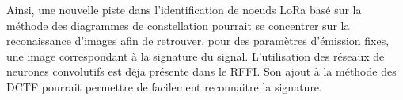\vspace{0.1cm}

Ainsi, une nouvelle piste dans l'identification de noeuds LoRa basé sur la méthode des diagrammes de constellation pourrait se concentrer sur la reconaissance d'images afin de retrouver, pour des paramètres d'émission fixes, une image correspondant à la signature du signal. L'utilisation des réseaux de neurones convolutifs est déja présente dans le \ac{RFFI}. Son ajout à la méthode des \ac{DCTF} pourrait permettre de facilement reconnaitre la signature.